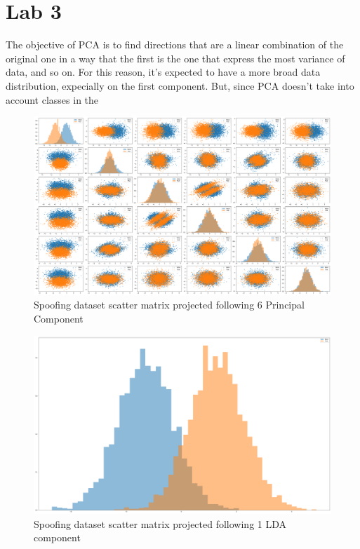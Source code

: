 \section{Lab 3}

The objective of PCA is to find directions that are a linear combination
of the original one in a way that the first is the one that express the most
variance of data, and so on. For this reason, it's expected to have a more broad
data distribution, expecially on the first component. But, since PCA doesn't
take into account classes in the 

\begin{figure}[htbp]
    \centering
    \includegraphics[width=0.9\linewidth]{lab03/PCA_6_scatter_matrix.png} %
    \caption{Spoofing dataset scatter matrix projected following 6 Principal Component}
    \label{fig:PCA_6_scatter}
\end{figure}

\begin{figure}[htbp]
    \centering
    \includegraphics[width=0.9\linewidth]{lab03/LDA_1_scatter_matrix.png} %
    \caption{Spoofing dataset scatter matrix projected following 1 LDA component}
    \label{fig:LDA_1_scatter}
\end{figure}